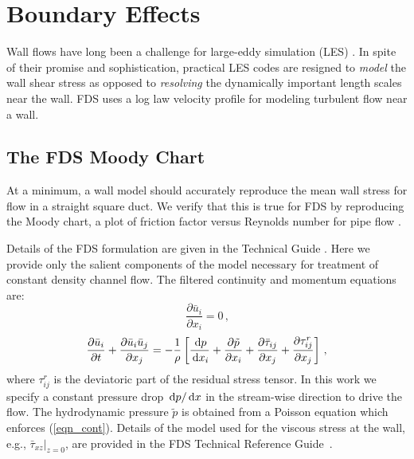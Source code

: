 \documentclass[11pt]{book}
\begin{document}
\chapter{Boundary Effects}

Wall flows have long been a challenge for large-eddy simulation (LES) \cite{Baggett:1997,Baggett:1998,Cabot:1995,Pope:2000,Sagaut:2001}.  In spite of their promise and sophistication, practical LES codes are resigned to \emph{model} the wall shear stress as opposed to \emph{resolving} the dynamically important length scales near the wall. FDS uses a log law velocity profile \cite{Pope:2000} for modeling turbulent flow near a wall.

\section{The FDS Moody Chart}
\label{fds_moody_chart}

At a minimum, a wall model should accurately reproduce the mean wall stress for flow in a straight square duct.  We verify that this is true for FDS by reproducing the Moody chart, a plot of friction factor versus Reynolds number for pipe flow \cite{Moody:1944}.

Details of the FDS formulation are given in the Technical Guide \cite{FDS_Math_Guide}.  Here we provide only the salient components of the model necessary for treatment of constant density channel flow. The filtered continuity and momentum equations are:
\begin{equation}
\label{eqn_cont}
\frac{\partial \bar{u}_i}{\partial x_i} = 0 \,\mbox{,}
\end{equation}
\begin{equation}
\label{eqn_mom1}
\frac{\partial \bar{u}_i}{\partial t} + \frac{\partial \bar{u}_i \bar{u}_j}{\partial x_j} = -\frac{1}{\rho} \left[ \frac{\,\mathrm{d} p}{\,\mathrm{d} x_i} + \frac{\partial \tilde{p}}{\partial x_i} + \frac{\partial \bar{\tau}_{ij}}{\partial x_j} + \frac{\partial \tau_{ij}^{r}}{\partial x_j} \right]\,\mbox{,}
\end{equation}
where $\tau_{ij}^{r}$ is the deviatoric part of the residual stress tensor.  In this work we specify a constant pressure drop $\,\mathrm{d} p/\,\mathrm{d} x$ in the stream-wise direction to drive the flow.  The hydrodynamic pressure $\tilde{p}$ is obtained from a Poisson equation which enforces (\ref{eqn_cont}). Details of the model used for the viscous stress at the wall, e.g., $\bar{\tau}_{xz}|_{z=0}$, are provided in the FDS Technical Reference Guide~\cite{FDS_Tech_Guide}.
\end{document}
